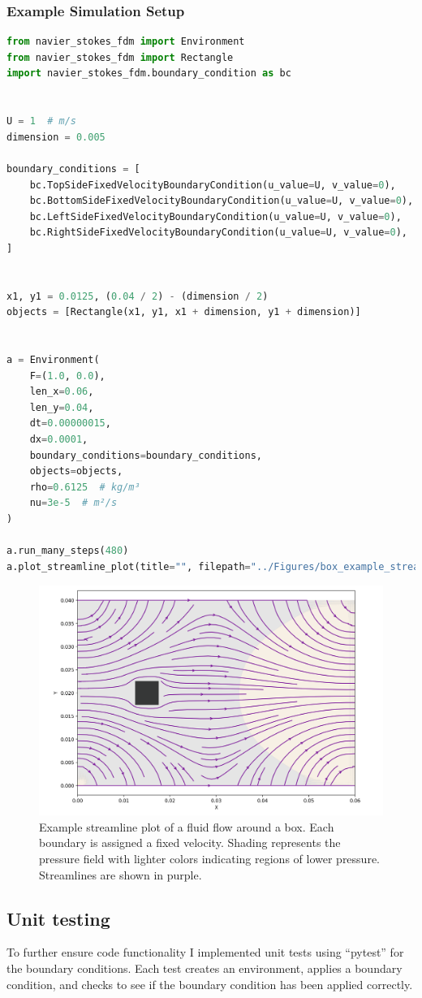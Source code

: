 \subsubsection{Example Simulation Setup}
\begin{lstlisting}[language = Python]
from navier_stokes_fdm import Environment
from navier_stokes_fdm import Rectangle
import navier_stokes_fdm.boundary_condition as bc


U = 1  # m/s
dimension = 0.005

boundary_conditions = [
    bc.TopSideFixedVelocityBoundaryCondition(u_value=U, v_value=0),
    bc.BottomSideFixedVelocityBoundaryCondition(u_value=U, v_value=0),
    bc.LeftSideFixedVelocityBoundaryCondition(u_value=U, v_value=0),
    bc.RightSideFixedVelocityBoundaryCondition(u_value=U, v_value=0),
]


x1, y1 = 0.0125, (0.04 / 2) - (dimension / 2)
objects = [Rectangle(x1, y1, x1 + dimension, y1 + dimension)]


a = Environment(
    F=(1.0, 0.0),
    len_x=0.06,
    len_y=0.04,
    dt=0.00000015,
    dx=0.0001,
    boundary_conditions=boundary_conditions,
    objects=objects,
    rho=0.6125  # kg/m³
    nu=3e-5  # m²/s
)

a.run_many_steps(480)
a.plot_streamline_plot(title="", filepath="../Figures/box_example_streamline.png")
\end{lstlisting}

\begin{figure}[h]
    \centering
    \includegraphics[width=0.5\linewidth]{Figures/box_example_streamline.png}
    \caption{Example streamline plot of a fluid flow around a box. Each boundary is assigned a fixed velocity. Shading represents the pressure field with lighter colors indicating regions of lower pressure. Streamlines are shown in purple.}
    \label{fig:box_example_streamline}
\end{figure}



\subsection{Unit testing}
To further ensure code functionality I implemented unit tests using ``pytest'' for the boundary conditions.
Each test creates an environment, applies a boundary condition, and checks to see if the boundary condition has been applied correctly.

